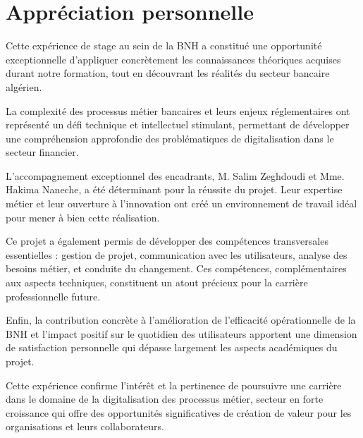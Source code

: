 \section*{Appréciation personnelle}

Cette expérience de stage au sein de la BNH a constitué une opportunité exceptionnelle d'appliquer concrètement les connaissances théoriques acquises durant notre formation, tout en découvrant les réalités du secteur bancaire algérien.

\medskip

La complexité des processus métier bancaires et leurs enjeux réglementaires ont représenté un défi technique et intellectuel stimulant, permettant de développer une compréhension approfondie des problématiques de digitalisation dans le secteur financier.

\medskip

L'accompagnement exceptionnel des encadrants, M. Salim Zeghdoudi et Mme. Hakima Naneche, a été déterminant pour la réussite du projet. Leur expertise métier et leur ouverture à l'innovation ont créé un environnement de travail idéal pour mener à bien cette réalisation.

\medskip

Ce projet a également permis de développer des compétences transversales essentielles : gestion de projet, communication avec les utilisateurs, analyse des besoins métier, et conduite du changement. Ces compétences, complémentaires aux aspects techniques, constituent un atout précieux pour la carrière professionnelle future.

\medskip

Enfin, la contribution concrète à l'amélioration de l'efficacité opérationnelle de la BNH et l'impact positif sur le quotidien des utilisateurs apportent une dimension de satisfaction personnelle qui dépasse largement les aspects académiques du projet.

\medskip

Cette expérience confirme l'intérêt et la pertinence de poursuivre une carrière dans le domaine de la digitalisation des processus métier, secteur en forte croissance qui offre des opportunités significatives de création de valeur pour les organisations et leurs collaborateurs.